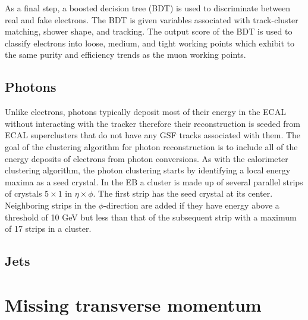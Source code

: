 As a final step, a boosted decision tree (BDT) is used to discriminate between real and fake electrons.  The BDT is given variables associated with track-cluster matching, shower shape, and tracking.  The output score of the BDT is used to classify electrons into loose, medium, and tight working points which exhibit to the same purity and efficiency trends as the muon working points.

\subsection{Photons} 
Unlike electrons, photons typically deposit most of their energy in the ECAL without interacting with the tracker therefore their reconstruction is seeded from ECAL superclusters that do not have any GSF tracks associated with them.  The goal of the clustering algorithm for photon reconstruction is to include all of the energy deposits of electrons from photon conversions.  As with the calorimeter clustering algorithm, the photon clustering starts by identifying a local energy maxima as a seed crystal. In the EB a cluster is made up of several parallel strips of crystals $5\times1$ in $\eta \times \phi$.  The first strip has the seed crystal at its center.  Neighboring strips in the $\phi$-direction are added if they have energy above a threshold of 10 GeV but less than that of the subsequent strip with a maximum of 17 strips in a cluster.


\subsection{Jets}

\section{Missing transverse momentum}

